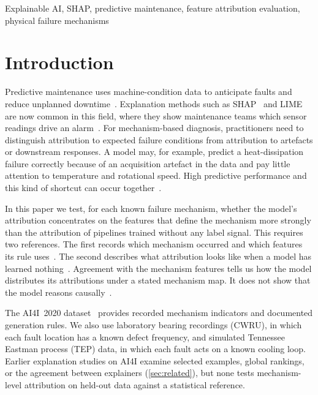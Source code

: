 \documentclass[conference]{IEEEtran}
\begin{document}
\begin{IEEEkeywords}
Explainable AI, SHAP, predictive maintenance, feature attribution evaluation,
physical failure mechanisms
\end{IEEEkeywords}

\section{Introduction}
Predictive maintenance uses machine-condition data to anticipate faults and reduce unplanned downtime~\cite{cummins2024survey}. Explanation methods such as SHAP~\cite{lundberg2017shap} and LIME~\cite{ribeiro2016lime} are now common in this field, where they show maintenance teams which sensor readings drive an alarm~\cite{steurtewagen2021adding,gawde2024explainable,ndao2025improving}. For mechanism-based diagnosis, practitioners need to distinguish attribution to expected failure conditions from attribution to artefacts or downstream responses. A model may, for example, predict a heat-dissipation failure correctly because of an acquisition artefact in the data and pay little attention to temperature and rotational speed. High predictive performance and this kind of shortcut can occur together~\cite{geirhos2020shortcut,lapuschkin2019unmasking}.

In this paper we test, for each known failure mechanism, whether the model's attribution concentrates on the features that define the mechanism more strongly than the attribution of pipelines trained without any label signal. This requires two references. The first records which mechanism occurred and which features its rule uses~\cite{zhou2022attribute}. The second describes what attribution looks like when a model has learned nothing~\cite{altmann2010permutation}. Agreement with the mechanism features tells us how the model distributes its attributions under a stated mechanism map. It does not show that the model reasons causally~\cite{janzing2020feature}.

The AI4I~2020 dataset~\cite{uci2020ai4i} provides recorded mechanism indicators and documented generation rules. We also use laboratory bearing recordings (CWRU), in which each fault location has a known defect frequency, and simulated Tennessee Eastman process (TEP) data, in which each fault acts on a known cooling loop. Earlier explanation studies on AI4I examine selected examples, global rankings, or the agreement between explainers (\cref{sec:related}), but none tests mechanism-level attribution on held-out data against a statistical reference.
\end{document}
